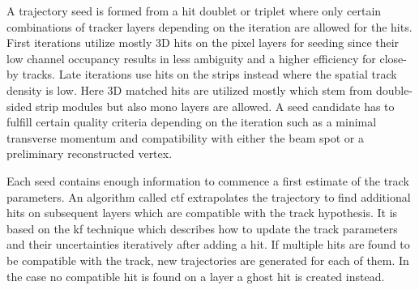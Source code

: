 
A trajectory seed is formed from a hit doublet or triplet where only certain combinations of tracker layers depending on the iteration are allowed for the hits. First iterations utilize mostly 3D hits on the pixel layers for seeding since their low channel occupancy results in less ambiguity and a higher efficiency for close-by tracks. Late iterations use hits on the strips instead where the spatial track density is low. Here 3D matched hits are utilized mostly which stem from double-sided strip modules but also mono layers are allowed. A seed candidate has to fulfill certain quality criteria depending on the iteration such as a minimal transverse momentum and compatibility with either the beam spot or a preliminary reconstructed vertex.

Each seed contains enough information to commence a first estimate of the track parameters. An algorithm called \gls{ctf} extrapolates the trajectory to find additional hits on subsequent layers which are compatible with the track hypothesis. It is based on the \gls{kf} technique which describes how to update the track parameters and their uncertainties iteratively after adding a hit. If multiple hits are found to be compatible with the track, new trajectories are generated for each of them. In the case no compatible hit is found on a layer a ghost hit is created instead.

